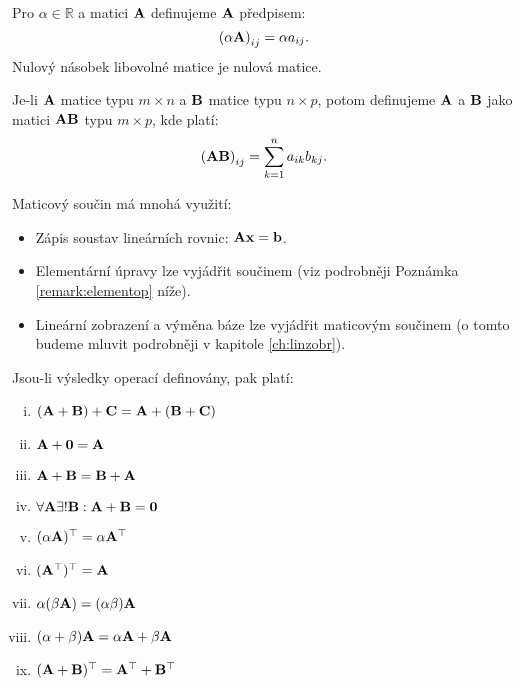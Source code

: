 \begin{definition}
    Pro $\alpha \in \mathbb{R}$ a matici $\mathbf{A}$ definujeme 
     $\mathbf{A}$ předpisem:
    $$\left(\alpha\mathbf{A}\right)_{ij} = \alpha a_{ij}.$$
    Nulový násobek libovolné matice je nulová matice.
\end{definition}

\begin{definition}
    Je-li $\mathbf{A}$ matice typu $m \times n$ a $\mathbf{B}$ matice typu $n
    \times p$, potom definujeme  $\mathbf{A}$ a 
    $\mathbf{B}$ jako matici $\mathbf{A}\mathbf{B}$ typu $m \times p$, kde platí:
    $$\left(\mathbf{A}\mathbf{B}\right)_{ij} = \sum_{k=1}^n{a_{ik}b_{kj}}.$$
\end{definition}

\begin{remark}
    Maticový součin má mnohá využití:
        \begin{itemize}
        \item Zápis soustav lineárních rovnic: $\mathbf{A}\mathbf{x} = \mathbf{b}$.
        \item Elementární úpravy lze vyjádřit součinem (viz podrobněji 
            Poznámka \ref{remark:elementop} níže).
        \item Lineární zobrazení a výměna báze lze vyjádřit maticovým součinem
            (o tomto budeme mluvit podrobněji v kapitole \ref{ch:linzobr}).
    \end{itemize}
\end{remark}

\begin{proposition}
    Jsou-li výsledky operací definovány, pak platí:
    \begin{multicols}{2}
        \begin{enumerate}[i.]
            \item $(\mathbf{A}+\mathbf{B})+\mathbf{C} = \mathbf{A}+(\mathbf{B}+\mathbf{C})$
            \item $\mathbf{A} + \mathbf{0} = \mathbf{A}$
            \item $\mathbf{A} + \mathbf{B} = \mathbf{B} + \mathbf{A}$
            \item $\forall \mathbf{A} \exists ! \mathbf{B}: \mathbf{A} + \mathbf{B} = \mathbf{0}$
            \item $(\alpha\mathbf{A})^\top = \alpha\mathbf{A}^\top$
            \item $(\mathbf{A}^\top)^\top = \mathbf{A}$
            \item $\alpha(\beta\mathbf{A}) = (\alpha\beta)\mathbf{A}$
            \item $(\alpha + \beta)\mathbf{A} = \alpha\mathbf{A} + \beta\mathbf{A}$
            \item $(\mathbf{A} + \mathbf{B})^\top = \mathbf{A}^\top + \mathbf{B}^\top$
        \end{enumerate}
    \end{multicols}
\end{proposition}

